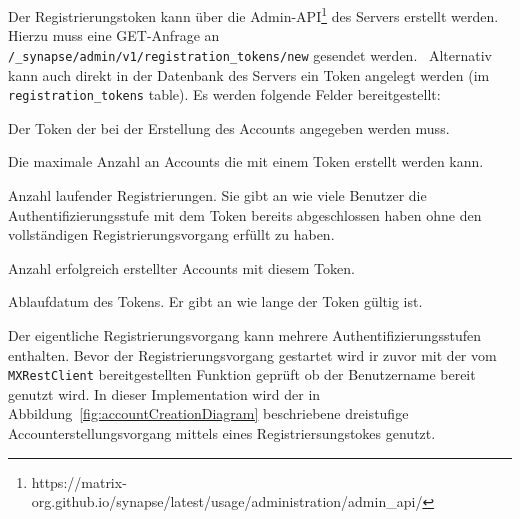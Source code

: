     Der Registrierungstoken kann über die Admin-API\footnote{https://matrix-org.github.io/synapse/latest/usage/administration/admin\_api/} des Servers erstellt werden.
    Hierzu muss eine GET-Anfrage an \texttt{/\_synapse/admin/v1/registration\_tokens/new} gesendet werden.~\cite{synapseregistartiontoken}
    Alternativ kann auch direkt in der Datenbank des Servers ein Token angelegt werden (im \texttt{registration\_tokens} table).
    Es werden folgende Felder bereitgestellt:
    \begin{description}[leftmargin=!,labelwidth=3cm]
        \item [token] Der Token der bei der Erstellung des Accounts angegeben werden muss.
        \item [uses\_allowed] Die maximale Anzahl an Accounts die mit einem Token erstellt werden kann.
        \item [pending] Anzahl laufender Registrierungen.
        Sie gibt an wie viele Benutzer die Authentifizierungsstufe mit dem Token bereits abgeschlossen haben ohne den vollständigen Registrierungsvorgang erfüllt zu haben.
        \item [completed] Anzahl erfolgreich erstellter Accounts mit diesem Token.
        \item [expiry\_time] Ablaufdatum des Tokens. Er gibt an wie lange der Token gültig ist.
    \end{description}

    Der eigentliche Registrierungsvorgang kann mehrere Authentifizierungsstufen enthalten.
    Bevor der Registrierungsvorgang gestartet wird ir zuvor mit der vom \texttt{MXRestClient} bereitgestellten Funktion geprüft ob der Benutzername bereit genutzt wird.
    In dieser Implementation wird der in Abbildung~\ref{fig:accountCreationDiagram} beschriebene dreistufige Accounterstellungsvorgang mittels eines Registriersungstokes genutzt.

